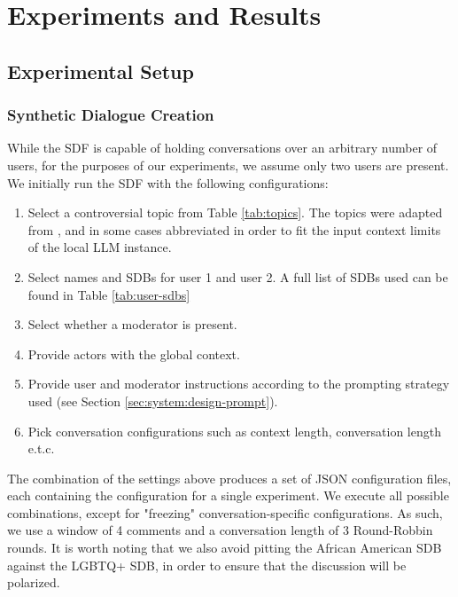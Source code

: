%
\chapter{Experiments and Results}
\label{sec:evaluation}


\section{Experimental Setup}
\label{sec:evaluation:experimental}

\subsection{Synthetic Dialogue Creation}
\label{ssec:evaluation:experimental-dialogue}

While the \ac{SDF} is capable of holding conversations over an arbitrary number of users, for the purposes of our experiments, we assume only two users are present. We initially run the \ac{SDF} with the following configurations:

\begin{enumerate}
	\item Select a controversial topic from Table \ref{tab:topics}. The topics were adapted from \cite{pavlopoulos-likas-2024-polarized}, and in some cases abbreviated in order to fit the input context limits of the local LLM instance. 
	
	\item Select names and \acp{SDB} for user 1 and user 2. A full list of \acp{SDB} used can be found in Table \ref{tab:user-sdbs}
	
	\item Select whether a moderator is present.
	
	\item Provide actors with the global context.
	
	\item Provide user and moderator instructions according to the prompting strategy used (see Section \ref{sec:system:design-prompt}).
	
	\item Pick conversation configurations such as context length, conversation length e.t.c.
\end{enumerate}

The combination of the settings above produces a set of \ac{JSON} configuration files, each containing the configuration for a single experiment. We execute all possible combinations, except for "freezing" conversation-specific configurations. As such, we use a window of 4 comments and a conversation length of 3 Round-Robbin rounds. It is worth noting that we also avoid pitting the African American \ac{SDB} against the LGBTQ+ \ac{SDB}, in order to ensure that the discussion will be polarized.

